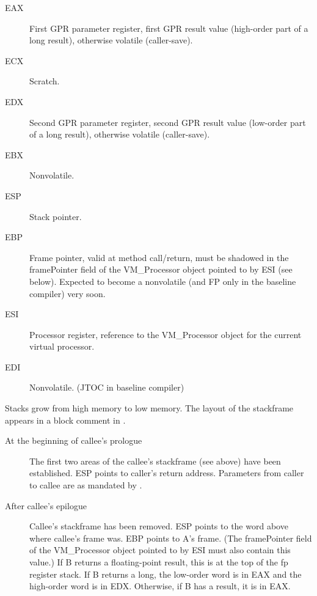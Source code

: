 \begin{description}
\item [EAX]
    First GPR parameter register, first GPR result value (high-order part
    of a long result), otherwise volatile (caller-save).

\item[ECX]
    Scratch.

\item[EDX]
    Second GPR parameter register, second GPR result value (low-order part
    of a long result), otherwise volatile (caller-save).

\item[EBX]
    Nonvolatile.

\item[ESP]
    Stack pointer.

\item[EBP]
    Frame pointer, valid at method call/return, must be shadowed in the
    framePointer field of the VM\_Processor object pointed to by ESI (see
    below). Expected to become a nonvolatile (and FP only in the
    baseline compiler) very soon.

\item[ESI]
    Processor register, reference to the VM\_Processor object for the current
    virtual processor.

\item[EDI]
    Nonvolatile.  (JTOC in baseline compiler)

\end{description}


Stacks grow from high memory to low memory.
The layout of the stackframe appears in a block comment in
{\LintelStackframeLayoutURL}.


\begin{description}
\item[At the beginning of callee's prologue]
The first two areas of the callee's stackframe (see above) have been
     established.  ESP points to caller's return address.
     Parameters from caller to callee are as mandated by 
{\LintelRegisterConstantsURL}.
\item[After callee's epilogue]
     Callee's stackframe has been removed.  ESP points to the word above where
     callee's frame was.  EBP points to A's frame.  (The framePointer field
     of the VM\_Processor object pointed to by ESI must also contain
     this value.)  If B returns a floating-point result, this is at
     the top of the fp register stack.  If B returns a long, the
     low-order word is in EAX and the high-order word is in EDX.
     Otherwise, if B has a result, it is in EAX.

\end{description}

